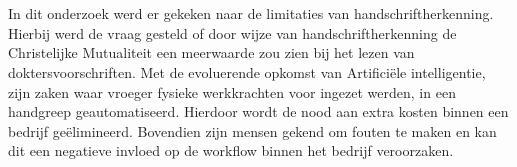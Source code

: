 
%
%

%



\chapter*{}

In dit onderzoek werd er gekeken naar de limitaties van handschriftherkenning. Hierbij werd de vraag gesteld of door wijze van handschriftherkenning de Christelijke Mutualiteit een meerwaarde zou zien bij het lezen van doktersvoorschriften. Met de evoluerende opkomst van Artificiële intelligentie, zijn zaken waar vroeger fysieke werkkrachten voor ingezet werden, in een handgreep geautomatiseerd. Hierdoor wordt de nood aan extra kosten binnen een bedrijf geëlimineerd. Bovendien zijn mensen gekend om fouten te maken en kan dit een negatieve invloed op de workflow binnen het bedrijf veroorzaken. 



